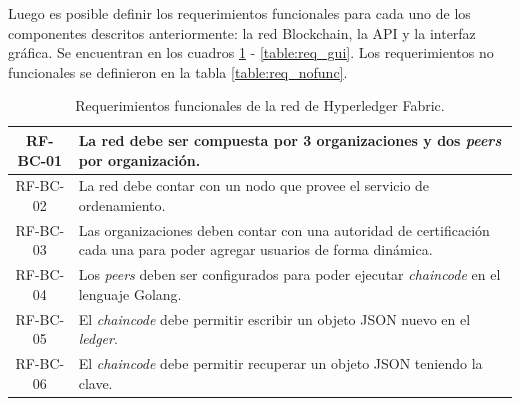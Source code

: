Luego es posible definir los requerimientos funcionales para cada uno de los componentes descritos anteriormente: la red Blockchain, la API y la interfaz gráfica. Se encuentran en los cuadros \ref{table:req_hlf} - \ref{table:req_gui}. Los requerimientos no funcionales se definieron en la tabla \ref{table:req_nofunc}.
\begin{table}[h]
\begin{tabularx}{\textwidth}{|c|X|}
\hline
RF-BC-01 & La red debe ser compuesta por 3 organizaciones y dos \textit{peers} por organización.\\
\hline
RF-BC-02 & La red debe contar con un nodo que provee el servicio de ordenamiento.\\
\hline
RF-BC-03 & Las organizaciones deben contar con una autoridad de certificación cada una para poder agregar usuarios de forma dinámica.\\
\hline
RF-BC-04 & Los \textit{peers} deben ser configurados para poder ejecutar \textit{chaincode} en el lenguaje Golang.\\
\hline
RF-BC-05 & El \textit{chaincode} debe permitir escribir un objeto JSON nuevo en el \textit{ledger}.\\
\hline
RF-BC-06 & El \textit{chaincode} debe permitir recuperar un objeto JSON teniendo la clave.\\
\hline
\end{tabularx}
\caption{Requerimientos funcionales de la red de Hyperledger Fabric.}
\label{table:req_hlf}
\end{table}


